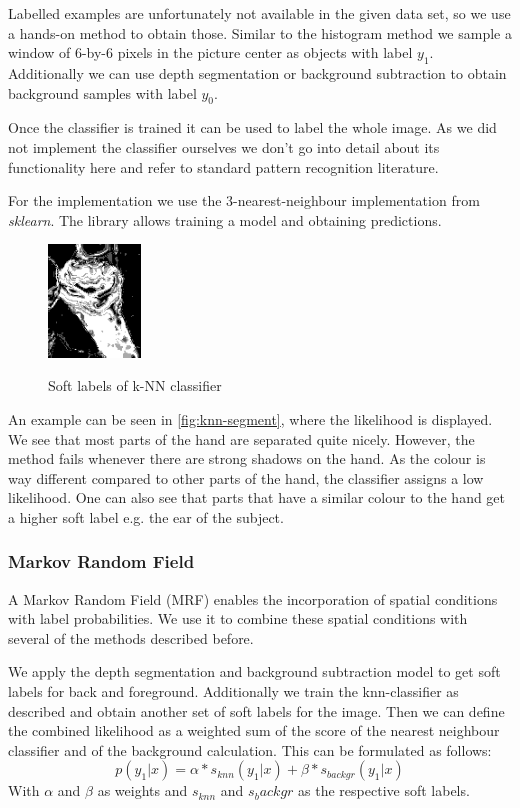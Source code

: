 \documentclass[letterpaper, 10 pt, conference]{ieeeconf}  %
\begin{document}
Labelled examples are unfortunately not available in the given data set, so we use a hands-on method to obtain those. Similar to the histogram method we sample a window of 6-by-6 pixels in the picture center as objects with label $y_1$. Additionally we can use depth segmentation or background subtraction to obtain background samples with label $y_0$. 

Once the classifier is trained it can be used to label the whole image. As we did not implement the classifier ourselves we don't go into detail about its functionality here and refer to standard pattern recognition literature.

For the implementation we use the 3-nearest-neighbour implementation from \textit{sklearn}. The library allows training a model and obtaining predictions.

\begin{figure}
\centering
	\includegraphics[height=3cm]{knn-segment}
	\label{fig:knn-segment}
	\caption{Soft labels of k-NN classifier}
\end{figure}

An example can be seen in \autoref{fig:knn-segment}, where the likelihood is displayed. We see that most parts of the hand are separated quite nicely. However, the method fails whenever there are strong shadows on the hand. As the colour is way different compared to other parts of the hand, the classifier assigns a low likelihood. One can also see that parts that have a similar colour to the hand get a higher soft label e.g. the ear of the subject.

\subsubsection{Markov Random Field}

A Markov Random Field (MRF) enables the incorporation of spatial conditions with label probabilities. We use it to combine these spatial conditions with several of the methods described before.

We apply the depth segmentation and background subtraction model to get soft labels for back and foreground. Additionally we train the knn-classifier as described and obtain another set of soft labels for the image. Then we can define the combined likelihood as a weighted sum of the score of the nearest neighbour classifier and of the background calculation. This can be formulated as follows:
\begin{equation}
p(y_1 | x) = \alpha * s_{knn}(y_1 | x) + \beta * s_{backgr}(y_1 | x) 
\end{equation}
With $\alpha$ and $\beta$ as weights and $s_{knn}$ and $s_backgr$ as the respective soft labels.
\end{document}
